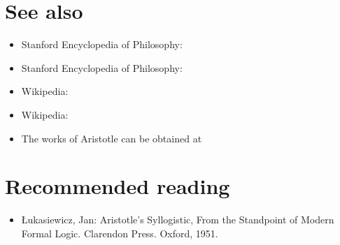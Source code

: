 \documentclass[12pt]{article}
\begin{document}
\section*{See also}
\begin{itemize}
\item Stanford Encyclopedia of Philosophy: 
\item Stanford Encyclopedia of Philosophy: 
\item Wikipedia: 
\item Wikipedia: 
\item The works of Aristotle can be obtained at 
\end{itemize}

\section*{Recommended reading}
\begin{itemize}
\item \L ukasiewicz, Jan: Aristotle's Syllogistic, From the Standpoint of Modern Formal Logic. Clarendon Press. Oxford, 1951.
\end{itemize}
\end{document}
